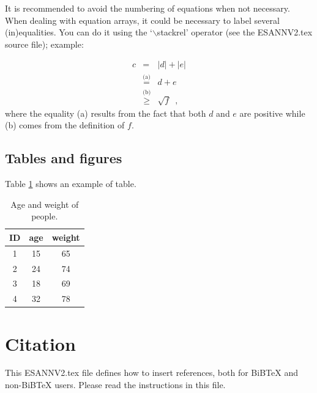 \documentclass[8pt,a4paper]{article}
\begin{document}
It is recommended to avoid the numbering of equations when not
necessary. When dealing with equation arrays, it could be
necessary to label several (in)equalities. You can do it using the
`$\backslash$stackrel' operator (see the ESANNV2.tex source file);
example:

\begin{eqnarray}
c&=&|d|+|e|\nonumber\\
&\stackrel{\text{(a)}}{=}&d+e\nonumber\\
&\stackrel{\text{(b)}}{\geq}&\sqrt{f}\enspace,
\end{eqnarray}
\noindent where the equality (a) results from the fact that both
$d$ and $e$ are positive while (b) comes from the definition of
$f$.

\subsection{Tables and figures}


Table \ref{Tab:AgeWeight} shows an example of table.

\begin{table}[h!]
  \centering
  \begin{tabular}{|c|c|c|}
    \hline
    ID & age & weight \\
    \hline
    1& 15 & 65 \\
    2& 24 & 74\\
    3& 18 & 69 \\
    4& 32 & 78 \\
    \hline
  \end{tabular}
  \caption{Age and weight of people.}\label{Tab:AgeWeight}
\end{table}

\section{Citation}
This ESANNV2.tex file defines how to insert references, both for
BiBTeX and non-BiBTeX users.  Please read the instructions in this
file.

\end{document}

